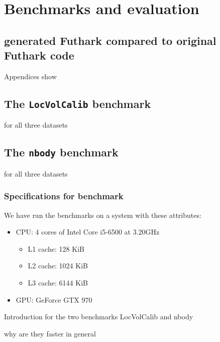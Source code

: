 \chapter{Benchmarks and evaluation}
\section{\fshark{} generated Futhark compared to original Futhark code}

Appendices show 
\section{The \texttt{LocVolCalib} benchmark}

for all three datasets


\section{The \texttt{nbody} benchmark}

for all three datasets


\subsection{Specifications for benchmark}
We have run the benchmarks on a system with these attributes:
\begin{itemize}
\item CPU: 4 cores of Intel Core i5-6500 at 3.20GHz
  \begin{itemize}
  \item L1 cache: 128 KiB 
  \item L2 cache: 1024 KiB 
  \item L3 cache: 6144 KiB 
  \end{itemize}
\item GPU: GeForce GTX 970
\end{itemize}


Introduction for the two benchmarks LocVolCalib and nbody



why are they faster in general



